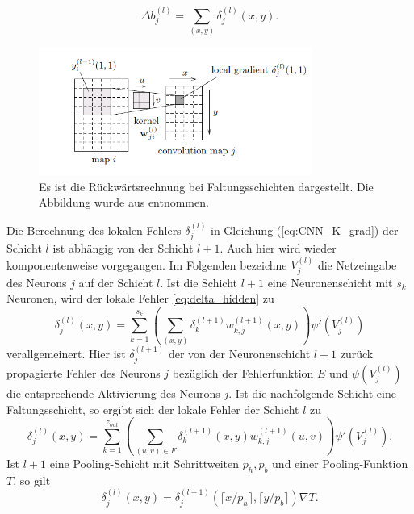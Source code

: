 \begin{equation*}
    \Delta b_j^{(l)}= \sum_{(x,y)} \delta_j^{(l)}(x,y).
\end{equation*}

\begin{figure}[h]
    \includegraphics[width=0.8\textwidth]{pics/chapters/CCN/backprop_dudiss.png}
    \centering
    \caption[Rückwärtsrechnung bei CNN]{Es ist die Rückwärtsrechnung bei Faltungsschichten dargestellt. Die Abbildung wurde aus \cite{du_diss} entnommen.}
    \label{abb:error_conv}
\end{figure}
Die Berechnung des lokalen Fehlers $\delta_{j}^{(l)}$ in Gleichung (\ref{eq:CNN_K_grad}) der Schicht $l$ ist abhängig von der Schicht $l+1$. Auch hier wird wieder komponentenweise vorgegangen. Im Folgenden bezeichne $V_j^{(l)}$ die Netzeingabe des Neurons $j$ auf der Schicht $l$.
Ist die Schicht $l+1$ eine Neuronenschicht mit $s_k$ Neuronen, wird der lokale Fehler \ref{eq:delta_hidden} zu
\begin{equation*}
    \delta_j^{(l)}(x,y)=\sum_{k=1}^{s_{k}} \left(\sum_{(x,y)} \delta_k^{(l+1)} w_{k,j}^{(l+1)}(x,y)\right) \psi'(V_j^{(l)})
\end{equation*}
verallgemeinert. 
Hier ist $\delta_j^{(l+1)}$ der von der Neuronenschicht $l+1$ zurück propagierte Fehler des Neurons $j$ bezüglich der Fehlerfunktion $E$ und $\psi(V^{(l)}_j)$ die entsprechende Aktivierung des Neurons $j$.
Ist die nachfolgende Schicht eine Faltungsschicht, so ergibt sich der lokale Fehler der Schicht $l$ zu
\begin{equation*}
    \delta_j^{(l)}(x,y)=\sum_{k=1}^{z_{out}} \left(\sum_{(u,v) \in F} \delta_k^{(l+1)}(x,y) w_{k,j}^{(l+1)}(u,v)\right) \psi'(V_j^{(l)}).
\end{equation*}
Ist $l+1$ eine Pooling-Schicht mit Schrittweiten $p_h,p_b$ und einer Pooling-Funktion $T$, so gilt
\begin{equation}
    \label{eq:upsample1}
    \delta_j^{(l)}(x,y)=\delta_j^{(l+1)}(\lceil x/p_h \rceil ,\lceil y/p_b \rceil)\nabla T.
\end{equation}
